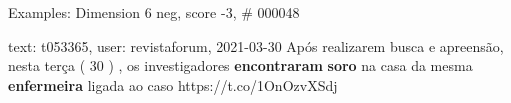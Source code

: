 \begin{frame}{Examples: Dimension 6 neg, score -3, \# 000048}
\footnotesize
\begin{alertblock}{text: t053365, user: revistaforum, 2021-03-30}
Após realizarem busca e apreensão, nesta terça ( 30 ) , os investigadores 
\textbf{encontraram} \textbf{soro} na casa da mesma \textbf{enfermeira} ligada 
ao caso https://t.co/1OnOzvXSdj 
\end{alertblock}
\end{frame}
